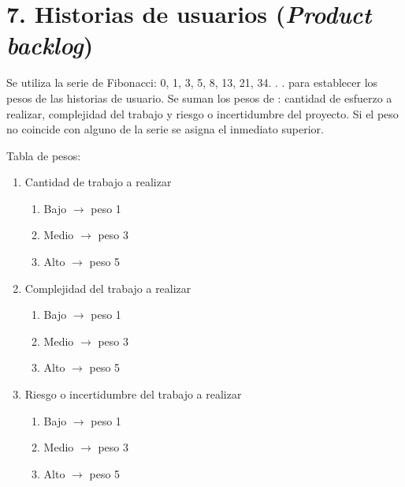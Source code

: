 \documentclass[
11pt, %
]{charter}
\begin{document}
\section{7. Historias de usuarios (\textit{Product backlog})}
\label{sec:backlog}

Se utiliza la serie de Fibonacci: 0, 1, 3, 5, 8, 13, 21, 34. . . para establecer los pesos de las historias de usuario. Se suman los pesos de : cantidad de esfuerzo a realizar, complejidad del trabajo y riesgo o incertidumbre del proyecto. Si el peso no coincide con alguno de la serie se asigna el inmediato superior.

Tabla de pesos:
\begin{enumerate}
\item Cantidad de trabajo a realizar
	\begin{enumerate}
	\item Bajo $\rightarrow$ peso 1 
	\item Medio $\rightarrow$ peso 3
	\item Alto $\rightarrow$ peso 5
	\end{enumerate}
\item Complejidad del trabajo a realizar
	\begin{enumerate}
	\item Bajo $\rightarrow$ peso 1 
	\item Medio $\rightarrow$ peso 3
	\item Alto $\rightarrow$ peso 5
	\end{enumerate}
\item Riesgo o incertidumbre del trabajo a realizar
	\begin{enumerate}
	\item Bajo $\rightarrow$ peso 1 
	\item Medio $\rightarrow$ peso 3
	\item Alto $\rightarrow$ peso 5
	\end{enumerate}
\end{enumerate}
\end{document}
